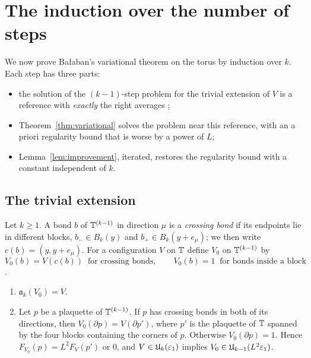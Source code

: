 \section{The induction over the number of steps}\label{sec:induction}

We now prove Ba\l aban's variational theorem on the torus by induction over $k$. Each step has three parts:
\begin{itemize}
\item the solution of the $(k-1)$-step problem for the trivial extension of $V$ is a reference with \emph{exactly} the right averages \cite[Sect.~A]{BalVar};
\item Theorem~\ref{thm:variational} solves the problem near this reference, with an a priori regularity bound that is worse by a power of $L$;
\item Lemma~\ref{lem:improvement}, iterated, restores the regularity bound with a constant independent of $k$.
\end{itemize}

\subsection{The trivial extension}\label{ss:30.1}

Let $k\ge1$. A bond $b$ of $\mathbb T^{(k-1)}$ in direction $\mu$ is a \emph{crossing bond} if its endpoints lie in different blocks, $b_-\in B_k(y)$ and $b_+\in B_k(y+e_\mu)$; we then write $c(b)=(y,y+e_\mu)$. For a configuration $V$ on $\mathbb T$ define $V_0$ on $\mathbb T^{(k-1)}$ by
\[
V_0(b)=V(c(b))\ \text{ for crossing bonds},\qquad V_0(b)=1\ \text{ for bonds inside a block}
\]
\cite[(11)]{BalVar}.

\begin{lemma}\label{lem:trivial-extension}
\begin{enumerate}[label=(\alph*)]
\item $\mathfrak a_k(V_0)=V$.
\item Let $p$ be a plaquette of $\mathbb T^{(k-1)}$. If $p$ has crossing bonds in both of its directions, then $V_0(\partial p)=V(\partial p')$, where $p'$ is the plaquette of $\mathbb T$ spanned by the four blocks containing the corners of $p$. Otherwise $V_0(\partial p)=1$. Hence $F_{V_0}(p)=L^2F_V(p')$ or $0$, and $V\in\mathfrak U_k(\varepsilon_1)$ implies $V_0\in\mathfrak U_{k-1}(L^2\varepsilon_1)$.
\end{enumerate}
\end{lemma}

